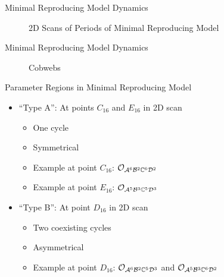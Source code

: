 \begin{frame}{Minimal Reproducing Model Dynamics}
    \vspace{-1.0em}
    \begin{figure}
        \centering
        \caption{2D Scans of Periods of Minimal Reproducing Model}
    \end{figure}
\end{frame}

\begin{frame}{Minimal Reproducing Model Dynamics}
    \begin{figure}
        \centering
        \caption{Cobwebs}
    \end{figure}
\end{frame}

\begin{frame}{Parameter Regions in Minimal Reproducing Model}
    \begin{itemize}
        \item ``Type A'': At points $C_{16}$ and $E_{16}$ in 2D scan
              \begin{itemize}
                  \item One cycle
                  \item Symmetrical
                  \item Example at point $C_{16}$: $\mathcal{O}_{\mathcal{A}^6\mathcal{B}^2\mathbb{C}^6\mathcal{D}^2}$
                  \item Example at point $E_{16}$: $\mathcal{O}_{\mathcal{A}^5\mathcal{B}^3\mathbb{C}^5\mathcal{D}^3}$ \vspace*{1em}
              \end{itemize}
        \item ``Type B'': At point $D_{16}$ in 2D scan
              \begin{itemize}
                  \item Two coexisting cycles
                  \item Asymmetrical
                  \item Example at point $D_{16}$: $\mathcal{O}_{\mathcal{A}^6\mathcal{B}^2\mathbb{C}^5\mathcal{D}^3}$ and $\mathcal{O}_{\mathcal{A}^5\mathcal{B}^3\mathbb{C}^6\mathcal{D}^2}$
              \end{itemize}
    \end{itemize}
\end{frame}

